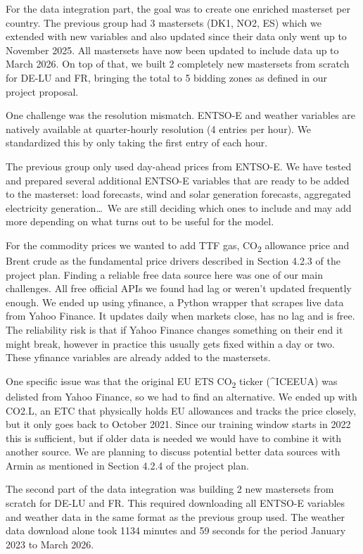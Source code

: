 \documentclass[12pt, a4paper]{article}
\begin{document}
For the data integration part, the goal was to create one enriched masterset per
country. The previous group had 3 mastersets (DK1, NO2, ES) which we extended
with new variables and also updated since their data only went up to November
2025. All mastersets have now been updated to include data up to March 2026. On
top of that, we built 2 completely new mastersets from scratch for DE-LU and FR,
bringing the total to 5 bidding zones as defined in our project proposal.

One challenge was the resolution mismatch. ENTSO-E and weather variables are
natively available at quarter-hourly resolution (4 entries per hour). We
standardized this by only taking the first entry of each hour.

The previous group only used day-ahead prices from ENTSO-E. We have tested and
prepared several additional ENTSO-E variables that are ready to be added to the
masterset: load forecasts, wind and solar generation forecasts, aggregated
electricity generation\ldots\ We are still deciding which ones to include and may
add more depending on what turns out to be useful for the model.

For the commodity prices we wanted to add TTF gas, CO\textsubscript{2} allowance
price and Brent crude as the fundamental price drivers described in Section 4.2.3
of the project plan. Finding a reliable free data source here was one of our main
challenges. All free official APIs we found had lag or weren't updated frequently
enough. We ended up using yfinance, a Python wrapper that scrapes live data from
Yahoo Finance. It updates daily when markets close, has no lag and is free. The
reliability risk is that if Yahoo Finance changes something on their end it might
break, however in practice this usually gets fixed within a day or two. These
yfinance variables are already added to the mastersets.

One specific issue was that the original EU ETS CO\textsubscript{2} ticker
(\textasciicircum ICEEUA) was delisted from Yahoo Finance, so we had to find an
alternative. We ended up with CO2.L, an ETC that physically holds EU allowances
and tracks the price closely, but it only goes back to October 2021. Since our
training window starts in 2022 this is sufficient, but if older data is needed we
would have to combine it with another source. We are planning to discuss potential
better data sources with Armin as mentioned in Section 4.2.4 of the project plan.

The second part of the data integration was building 2 new mastersets from
scratch for DE-LU and FR. This required downloading all ENTSO-E variables and
weather data in the same format as the previous group used. The weather data
download alone took 1134 minutes and 59 seconds for the period January 2023 to
March 2026.
\end{document}
